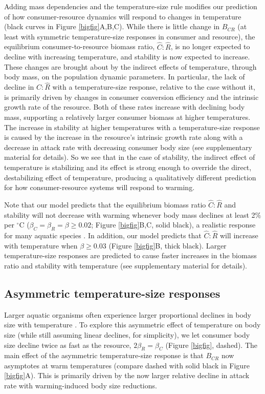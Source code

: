 \documentclass[11pt]{article}
\begin{document}
Adding mass dependencies and the temperature-size rule modifies our prediction of how consumer-resource dynamics will respond to changes in temperature (black curves in Figure \ref{bigfig}A,B,C).
While there is little change in $B_{CR}$ (at least with symmetric temperature-size responses in consumer and resource), the equilibrium consumer-to-resource biomass ratio, $\hat{C}:\hat{R}$, is no longer expected to decline with increasing temperature, and stability is now expected to increase.
These changes are brought about by the indirect effects of temperature, through body mass, on the population dynamic parameters.
In particular, the lack of decline in $\hat{C}:\hat{R}$ with a temperature-size response, relative to the case without it, is primarily driven by changes in consumer conversion efficiency and the intrinsic growth rate of the resource.
Both of these rates increase with declining body mass, supporting a relatively larger consumer biomass at higher temperatures. 
The increase in stability at higher temperatures with a temperature-size response is caused by the increase in the resource's intrinsic growth rate along with a decrease  in attack rate with decreasing consumer body size (see supplementary material for details). 
So we see that in the case of stability, the indirect effect of temperature is stabilizing and its effect is strong enough to override the direct, destabilizing effect of temperature, producing a qualitatively different prediction for how consumer-resource systems will respond to warming.

Note that our model predicts that the equilibrium biomass ratio $\hat{C}:\hat{R}$ and stability will not decrease with warming whenever body mass declines at least 2$\%$ per $^\circ$C ($\beta_C = \beta_R = \beta\geq0.02$; Figure \ref{bigfig}B,C, solid black), a realistic response for many aquatic species \citep{Forster2012,Horne2015}. 
In addition, our model predicts that $\hat{C}:\hat{R}$ will increase with temperature when $\beta\geq0.03$ (Figure \ref{bigfig}B, thick black).
Larger temperature-size responses are predicted to cause faster increases in the biomass ratio and stability with temperature (see supplementary material for details).

\subsection*{Asymmetric temperature-size responses}

Larger aquatic organisms often experience larger proportional declines in body size with temperature \citep{Forster2012,Horne2015}. 
To explore this asymmetric effect of temperature on body size (while still assuming linear declines, for simplicity), we let consumer body size decline twice as fast as the resource, $2 \beta_R = \beta_C$ (Figure \ref{bigfig}, dashed).
The main effect of the asymmetric temperature-size response is that $B_{CR}$ now asymptotes at warm temperatures (compare dashed with solid black in Figure \ref{bigfig}A). 
This is primarily driven by the now larger relative decline in attack rate with warming-induced body size reductions. %
\end{document}
